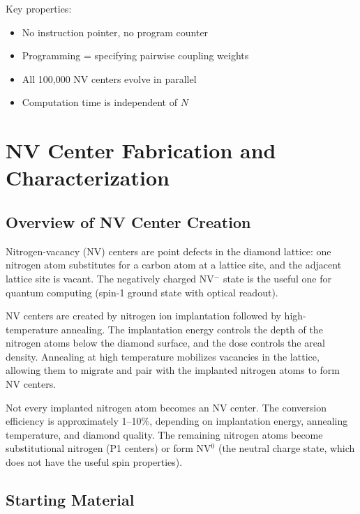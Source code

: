 \documentclass[11pt,a4paper,openany]{book}
\begin{document}
\noindent
Key properties:
\begin{itemize}[nosep]
  \item No instruction pointer, no program counter
  \item Programming = specifying pairwise coupling weights
  \item All 100,000 NV centers evolve in parallel
  \item Computation time is independent of $N$
\end{itemize}


\chapter{NV Center Fabrication and Characterization}\label{ch:fabrication}

\section{Overview of NV Center Creation}

Nitrogen-vacancy (NV) centers are point defects in the diamond lattice: one nitrogen atom substitutes for a carbon atom at a lattice site, and the adjacent lattice site is vacant. The negatively charged NV$^-$ state is the useful one for quantum computing (spin-1 ground state with optical readout).

NV centers are created by nitrogen ion implantation followed by high-temperature annealing. The implantation energy controls the depth of the nitrogen atoms below the diamond surface, and the dose controls the areal density. Annealing at high temperature mobilizes vacancies in the lattice, allowing them to migrate and pair with the implanted nitrogen atoms to form NV centers.

Not every implanted nitrogen atom becomes an NV center. The conversion efficiency is approximately 1--10\%, depending on implantation energy, annealing temperature, and diamond quality. The remaining nitrogen atoms become substitutional nitrogen (P1 centers) or form NV$^0$ (the neutral charge state, which does not have the useful spin properties).

\section{Starting Material}
\end{document}
